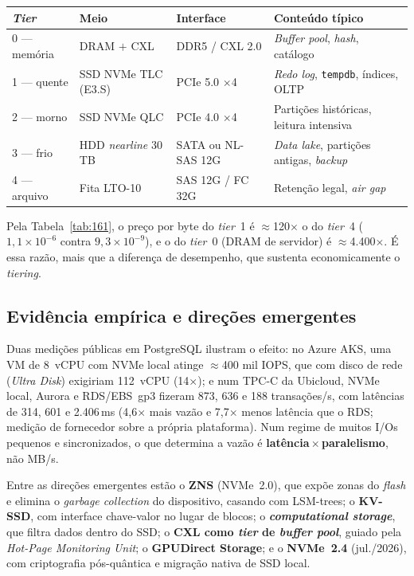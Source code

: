 \documentclass[11pt,a4paper]{article}
\begin{document}
\begin{center}\small
\begin{tabular}{@{}p{2.4cm}p{3.5cm}p{3.1cm}p{5.7cm}@{}}
\toprule
\textbf{\emph{Tier}} & \textbf{Meio} & \textbf{Interface} & \textbf{Conteúdo típico} \\
\midrule
0 --- memória & DRAM $+$ CXL & DDR5 / CXL 2.0 & \emph{Buffer pool}, \emph{hash}, catálogo \\
1 --- quente & SSD NVMe TLC (E3.S) & PCIe 5.0 $\times$4 & \emph{Redo log}, \texttt{tempdb}, índices, OLTP \\
2 --- morno & SSD NVMe QLC & PCIe 4.0 $\times$4 & Partições históricas, leitura intensiva \\
3 --- frio & HDD \emph{nearline} 30\,TB & SATA ou NL-SAS 12G & \emph{Data lake}, partições antigas, \emph{backup} \\
4 --- arquivo & Fita LTO-10 & SAS 12G / FC 32G & Retenção legal, \emph{air gap} \\
\bottomrule
\end{tabular}
\end{center}

Pela Tabela~\ref{tab:161}, o preço por byte do \emph{tier}~1 é $\approx$120$\times$ o do
\emph{tier}~4 ($1{,}1\times10^{-6}$ contra $9{,}3\times10^{-9}$), e o do \emph{tier}~0 (DRAM de
servidor) é $\approx$4.400$\times$. É essa razão, mais que a diferença de desempenho, que
sustenta economicamente o \emph{tiering}.

\subsection{Evidência empírica e direções emergentes}

Duas medições públicas em PostgreSQL ilustram o efeito: no Azure AKS, uma VM de 8~vCPU com NVMe
local atinge $\approx$400 mil IOPS, que com disco de rede (\emph{Ultra Disk}) exigiriam 112~vCPU
(14$\times$); e num TPC-C da Ubicloud, NVMe local, Aurora e RDS/EBS~gp3 fizeram 873, 636 e
188 transações/s, com latências de 314, 601 e 2.406\,ms (4,6$\times$ mais vazão e 7,7$\times$
menos latência que o RDS; medição de fornecedor sobre a própria plataforma). Num regime de
muitos I/Os pequenos e sincronizados, o que determina a vazão é
\textbf{latência\,$\times$\,paralelismo}, não MB/s.

Entre as direções emergentes estão o \textbf{ZNS} (NVMe~2.0), que expõe zonas do \emph{flash}
e elimina o \emph{garbage collection} do dispositivo, casando com LSM-trees; o \textbf{KV-SSD},
com interface chave-valor no lugar de blocos; o \textbf{\emph{computational storage}}, que
filtra dados dentro do SSD; o \textbf{CXL como \emph{tier} de \emph{buffer pool}}, guiado pela
\emph{Hot-Page Monitoring Unit}; o \textbf{GPUDirect Storage}; e o \textbf{NVMe~2.4}
(jul./2026), com criptografia pós-quântica e migração nativa de SSD local.
\end{document}
